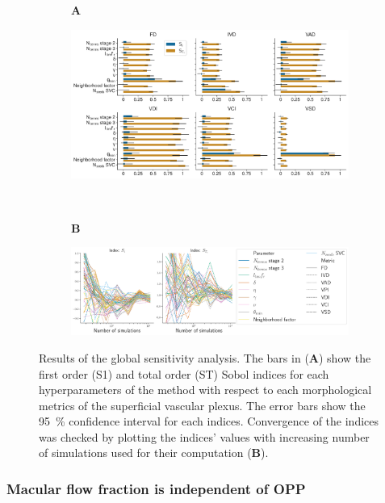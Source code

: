 \documentclass[11pt,]{article}
\begin{document}
\begin{figure}[ht!]
  \centering
  \begin{subfigure}[t]{.03\textwidth}
    \textbf{A}
  \end{subfigure}
  \begin{subfigure}[t]{.95\textwidth}
    \includegraphics[width=\textwidth, valign=t]{SobolIndices}
  \end{subfigure}
  \\
  \begin{subfigure}[t]{.03\textwidth}
    \textbf{B}
  \end{subfigure}
  \begin{subfigure}[t]{.95\textwidth}
    \includegraphics[width=\textwidth, valign=t]{ConvergenceSobolIndices}
  \end{subfigure}
  \caption{Results of the global sensitivity analysis. The bars in (\textbf{A}) show the first order (S1) and total order (ST) Sobol indices for each hyperparameters of the method with respect to each morphological metrics of the superficial vascular plexus. 
    The error bars show the \SI{95}{\%} confidence interval for each indices. Convergence of the indices was checked by plotting the indices' values with increasing number of simulations used for their computation (\textbf{B}).}
  \label{fig:gsa}
\end{figure}

\subsubsection{Macular flow fraction is independent of OPP}\label{sec:UQ}
\end{document}
